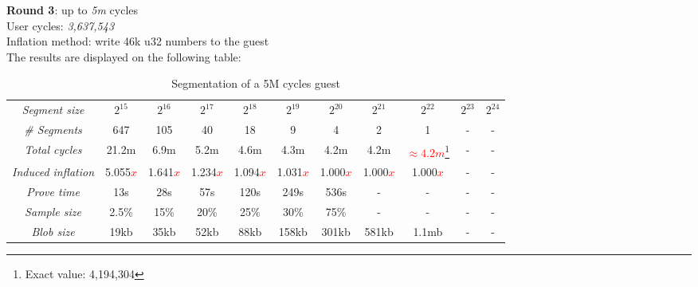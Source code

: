 \documentclass[a4paper, 10pt]{article}
\begin{document}
\par \noindent
\textbf{Round 3}: up to \textit{5m} cycles\\
User cycles: \textit{3,637,543}\\
Inflation method: write 46k u32 numbers to the guest\\
The results are displayed on the following table:
\begin{table}[H]
  	\begin{center}
    \label{tab:table4}
    \begin{minipage}{\textwidth}
    \begin{adjustbox}{width=\textwidth}
    \begin{tabular}{c|c|c|c|c|c|c|c|c|c|c}
	  \textit{Segment size} & $2^{15}$ & $2^{16}$ & $2^{17}$ & $2^{18}$ & $2^{19}$ & $2^{20}$ & $2^{21}$ & $2^{22}$ & $2^{23}$ & $2^{24}$\\
	  \textit{\# Segments} & 647 & 105 & 40 & 18 & 9 & 4 & 2 & 1 & - & -\\
	  \textit{Total cycles} & 21.2m & 6.9m & 5.2m & 4.6m & 4.3m & 4.2m & 4.2m & \textcolor{red}{$\approx 4.2m$}\footnote{Exact value: 4,194,304} & - & -\\
	  \textit{Induced inflation} & 5.055\textcolor{red}{$x$} & 1.641\textcolor{red}{$x$} & 1.234\textcolor{red}{$x$} & 1.094\textcolor{red}{$x$} & 1.031\textcolor{red}{$x$} & 1.000\textcolor{red}{$x$} & 1.000\textcolor{red}{$x$} & 1.000\textcolor{red}{$x$} & - & -\\
	  \textit{Prove time} & 13s & 28s & 57s & 120s & 249s & 536s & - & - & - & -\\
	  \textit{Sample size} & 2.5\% & 15\% & 20\% & 25\% & 30\% & 75\% & - & - & - & -\\
	  \textit{Blob size} & 19kb & 35kb & 52kb & 88kb &158kb & 301kb & 581kb & 1.1mb & - & -\\
   	\end{tabular}
   	\end{adjustbox}
   	\end{minipage}
    \caption{Segmentation of a 5M cycles guest}
  \end{center}
\end{table}
\end{document}
